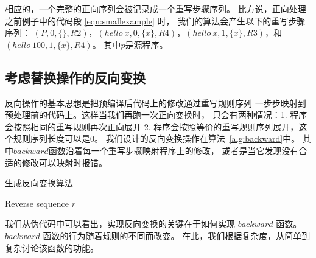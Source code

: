 相应的，一个完整的正向序列会被记录成一个重写步骤序列。
比方说，正向处理之前例子中的代码段 \ref{eqn:smallexample} 时，
我们的算法会产生以下的重写步骤序列：
$(P, 0, \{\}, R2)$，$(hello\ x, 0, \{x\}, R4)$，$(hello\ x, 1, \{x\}, R3)$，和
$(hello\ 100, 1, \{x\}, R4)$。
其中$p$是源程序。





\subsection{考虑替换操作的反向变换}\label{sec:backward}
反向操作的基本思想是把预编译后代码上的修改通过重写规则序列
一步步映射到预处理前的代码上。这样当我们再跑一次正向变换时，
只会有两种情况：1. 程序会按照相同的重写规则再次正向展开
2. 程序会按照等价的重写规则序列展开，这个规则序列长度可以是0。
我们设计的反向变换操作在算法~\ref{alg:backward}中。
其中$backward$函数沿着每一个重写步骤映射程序上的修改，
或者是当它发现没有合适的修改可以映射时报错。

\begin{algorithm}
  \newcommand\mycommfont[1]{\rmfamily{#1}}
  \caption{生成反向变换算法 \label{alg:backward}}
  Reverse sequence $r$\;
  \;
\end{algorithm}

我们从伪代码中可以看出，实现反向变换的关键在于如何实现 $backward$ 函数。
$backward$ 函数的行为随着规则的不同而改变。
在此，我们根据复杂度，从简单到复杂讨论该函数的功能。

